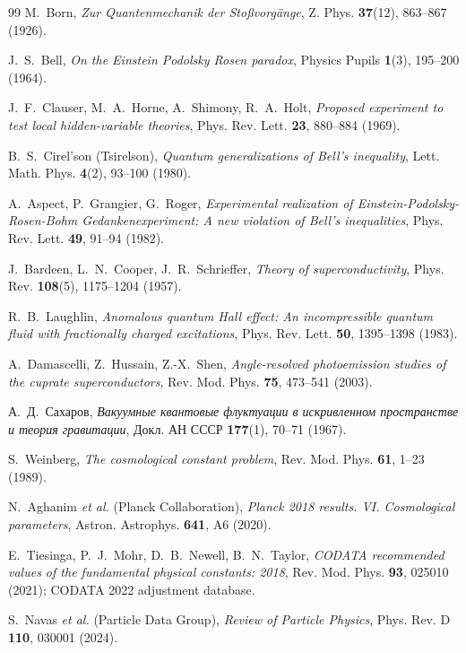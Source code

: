 \documentclass[12pt,a4paper]{article}
\theoremstyle{definition}
\theoremstyle{remark}
\begin{document}
\begin{thebibliography}{99}
	M.~Born, \textit{Zur Quantenmechanik der Sto{\ss}vorg\"ange}, Z. Phys. \textbf{37}(12), 863--867 (1926).
	
	J.~S.~Bell, \textit{On the Einstein Podolsky Rosen paradox}, Physics Pupils \textbf{1}(3), 195--200 (1964).

	J.~F.~Clauser, M.~A.~Horne, A.~Shimony, R.~A.~Holt, \textit{Proposed experiment to test local hidden-variable theories}, Phys. Rev. Lett. \textbf{23}, 880--884 (1969).
	
	B.~S.~Cirel'son (Tsirelson), \textit{Quantum generalizations of Bell's inequality}, Lett. Math. Phys. \textbf{4}(2), 93--100 (1980).
	
	A.~Aspect, P.~Grangier, G.~Roger, \textit{Experimental realization of Einstein-Podolsky-Rosen-Bohm Gedankenexperiment: A new violation of Bell's inequalities}, Phys. Rev. Lett. \textbf{49}, 91--94 (1982).
	
	J.~Bardeen, L.~N.~Cooper, J.~R.~Schrieffer, \textit{Theory of superconductivity}, Phys. Rev. \textbf{108}(5), 1175--1204 (1957).
	
	R.~B.~Laughlin, \textit{Anomalous quantum Hall effect: An incompressible quantum fluid with fractionally charged excitations}, Phys. Rev. Lett. \textbf{50}, 1395--1398 (1983).
	
	A.~Damascelli, Z.~Hussain, Z.-X.~Shen, \textit{Angle-resolved photoemission studies of the cuprate superconductors}, Rev. Mod. Phys. \textbf{75}, 473--541 (2003).
	
	А.~Д.~Сахаров, \textit{Вакуумные квантовые флуктуации в искривленном пространстве и теория гравитации}, Докл. АН СССР \textbf{177}(1), 70--71 (1967).
	
	S.~Weinberg, \textit{The cosmological constant problem}, Rev. Mod. Phys. \textbf{61}, 1--23 (1989).
	
	N.~Aghanim \textit{et al.} (Planck Collaboration), \textit{Planck 2018 results. VI. Cosmological parameters}, Astron. Astrophys. \textbf{641}, A6 (2020).
	
	E.~Tiesinga, P.~J.~Mohr, D.~B.~Newell, B.~N.~Taylor, \textit{CODATA recommended values of the fundamental physical constants: 2018}, Rev. Mod. Phys. \textbf{93}, 025010 (2021); CODATA 2022 adjustment database.
	
	S.~Navas \textit{et al.} (Particle Data Group), \textit{Review of Particle Physics}, Phys. Rev. D \textbf{110}, 030001 (2024).
	
\end{thebibliography}
\end{document}

